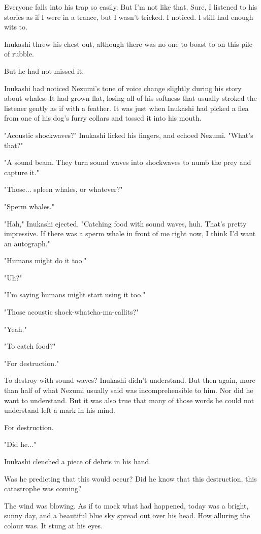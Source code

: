 Everyone falls into his trap so easily. But I'm not like that. Sure, I
listened to his stories as if I were in a trance, but I wasn't tricked.
I noticed. I still had enough wits to.

Inukashi threw his chest out, although there was no one to boast to on
this pile of rubble.

But he had not missed it.

Inukashi had noticed Nezumi's tone of voice change slightly during his
story about whales. It had grown flat, losing all of his softness that
usually stroked the listener gently as if with a feather. It was just
when Inukashi had picked a flea from one of his dog's furry collars and
tossed it into his mouth.

"Acoustic shockwaves?" Inukashi licked his fingers, and echoed Nezumi.
"What's that?"

"A sound beam. They turn sound waves into shockwaves to numb the prey
and capture it."

"Those... spleen whales, or whatever?"

"Sperm whales."

"Hah," Inukashi ejected. "Catching food with sound waves, huh. That's
pretty impressive. If there was a sperm whale in front of me right now,
I think I'd want an autograph."

"Humans might do it too."

"Uh?"

"I'm saying humans might start using it too."

"Those acoustic shock-whatcha-ma-callits?"

"Yeah."

"To catch food?"

"For destruction."

To destroy with sound waves? Inukashi didn't understand. But then again,
more than half of what Nezumi usually said was incomprehensible to him.
Nor did he want to understand. But it was also true that many of those
words he could not understand left a mark in his mind.

For destruction.

"Did he..."

Inukashi clenched a piece of debris in his hand.

Was he predicting that this would occur? Did he know that this
destruction, this catastrophe was coming?

The wind was blowing. As if to mock what had happened, today was a
bright, sunny day, and a beautiful blue sky spread out over his head.
How alluring the colour was. It stung at his eyes.

